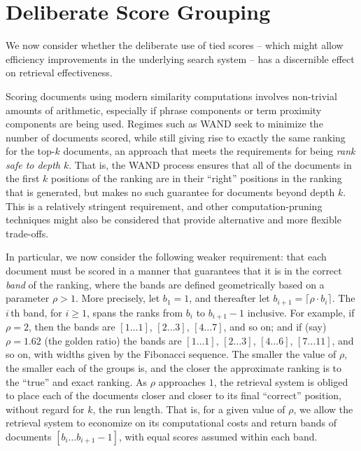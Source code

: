\section{Deliberate Score Grouping}
\label{sec-roundingoff}

We now consider whether the deliberate use of tied scores -- which
might allow efficiency improvements in the underlying search system
-- has a discernible effect on retrieval effectiveness.


Scoring documents using modern similarity computations involves
non-trivial amounts of arithmetic, especially if phrase components or
term proximity components are being used.
Regimes such as WAND {\citep{bchsz03cikm}} seek to minimize the
number of documents scored, while still giving rise to exactly the
same ranking for the top-$k$ documents, an approach that meets the
requirements for being {\emph{rank safe to depth $k$}}.
That is, the WAND process ensures that all of the documents in the
first $k$ positions of the ranking are in their ``right'' positions
in the ranking that is generated, but makes no such guarantee for
documents beyond depth $k$.
This is a relatively stringent requirement, and other
computation-pruning techniques might also be considered that provide
alternative and more flexible trade-offs.

In particular, we now consider the following weaker requirement: that
each document must be scored in a manner that guarantees that it is
in the correct {\emph{band}} of the ranking, where the bands are
defined geometrically based on a parameter $\rho>1$.
More precisely, let $b_1=1$, and thereafter let
$b_{i+1}=\lceil{\rho\cdot b_i}\rceil$.
The $i$\,th band, for $i\ge1$, spans the ranks from $b_i$ to
$b_{i+1}-1$ inclusive.
For example, if $\rho=2$, then the bands are $[1\ldots1]$,
$[2\ldots3]$, $[4\ldots7]$, and so on; and if (say) $\rho=1.62$ (the
golden ratio) the bands are $[1\ldots1]$, $[2\ldots3]$, $[4\ldots6]$,
$[7\ldots11]$, and so on, with widths given by the Fibonacci
sequence.
The smaller the value of $\rho$, the smaller each of the groups is,
and the closer the approximate ranking is to the ``true'' and exact
ranking.
As $\rho$ approaches $1$, the retrieval system is obliged to place
each of the documents closer and closer to its final ``correct''
position, without regard for $k$, the run length.
That is, for a given value of $\rho$, we allow the retrieval system
to economize on its computational costs and return bands of documents
$[b_i\ldots b_{i+1}-1]$, with equal scores assumed within each band.

